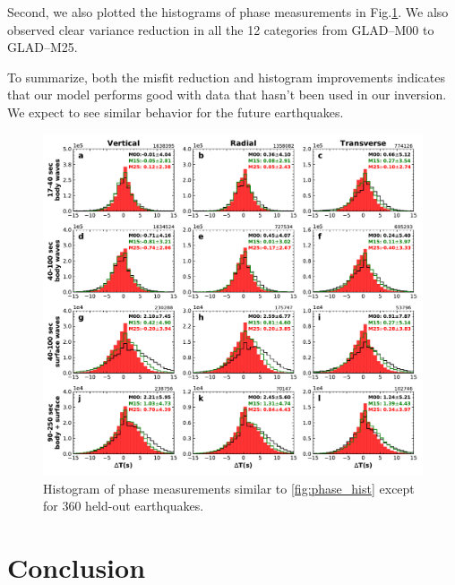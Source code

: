 \documentclass[extra,mreferee]{gji}
\begin{document}
Second, we also plotted the histograms of phase measurements in Fig.\ref{fig:phase_hist_360}. We also observed clear variance reduction in all the 12 categories from GLAD--M00 to GLAD--M25.

To summarize, both the misfit reduction and histogram improvements indicates that our model performs good with data that hasn't been used in our inversion. We expect to see similar behavior for the future earthquakes.

\begin{figure}
  \centering
  \includegraphics[width=\textwidth]{figures/dt_histogram_360.pdf}
  \caption{Histogram of phase measurements similar to \ref{fig:phase_hist} except for 360 held-out earthquakes.}
  \label{fig:phase_hist_360}
\end{figure}


\section{Conclusion}
\end{document}
